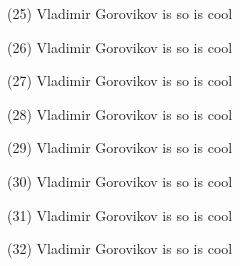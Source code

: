 \documentclass{article}%
\begin{document}
\newline%
\begin{minipage}{0.3333333333333333\textwidth}%
(25) Vladimir Gorovikov%
\newline%
%
is so%
\newline%
%
is cool%
\newline%
%
\end{minipage}%
\begin{minipage}{0.3333333333333333\textwidth}%
(26) Vladimir Gorovikov%
\newline%
%
is so%
\newline%
%
is cool%
\newline%
%
\end{minipage}%
\begin{minipage}{0.3333333333333333\textwidth}%
(27) Vladimir Gorovikov%
\newline%
%
is so%
\newline%
%
is cool%
\newline%
%
\end{minipage}%
\newline%
\begin{minipage}{0.3333333333333333\textwidth}%
(28) Vladimir Gorovikov%
\newline%
%
is so%
\newline%
%
is cool%
\newline%
%
\end{minipage}%
\begin{minipage}{0.3333333333333333\textwidth}%
(29) Vladimir Gorovikov%
\newline%
%
is so%
\newline%
%
is cool%
\newline%
%
\end{minipage}%
\begin{minipage}{0.3333333333333333\textwidth}%
(30) Vladimir Gorovikov%
\newline%
%
is so%
\newline%
%
is cool%
\newline%
%
\end{minipage}%
\newline%
\begin{minipage}{0.3333333333333333\textwidth}%
(31) Vladimir Gorovikov%
\newline%
%
is so%
\newline%
%
is cool%
\newline%
%
\end{minipage}%
\begin{minipage}{0.3333333333333333\textwidth}%
(32) Vladimir Gorovikov%
\newline%
%
is so%
\newline%
%
is cool%
\newline%
%
\end{minipage}%
\end{document}
